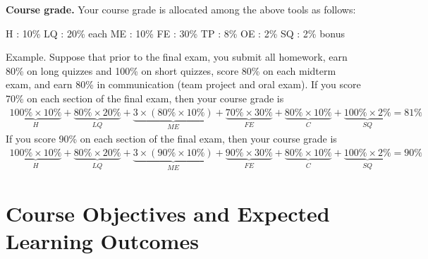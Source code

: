 \noindent{}\textbf{Course grade.}
Your course grade is allocated among the above tools as follows:
\begin{center}
{} \hfill{} H : 10\% \hfill{} LQ : 20\% \hfill{} each ME : 10\% \hfill{} FE : 30\% \hfill{} TP : 8\% \hfill{} OE : 2\% \hfill{} SQ : 2\% bonus \hfill{} {}
\end{center}
Example. Suppose that prior to the final exam, you submit all homework, earn 80\% on long quizzes and 100\% on short quizzes, score 80\% on each midterm exam, and earn 80\% in communication (team project and oral exam). If you score 70\% on each section of the final exam, then your course grade is
\begin{align*}
\underbrace{100\% \times 10 \%}_{H} + \underbrace{80\% \times 20 \%}_{LQ} + \underbrace{3 \times \left(80\% \times 10 \%\right)}_{ME} + \underbrace{70\% \times 30 \%}_{FE} + \underbrace{80\% \times 10 \%}_{C} + \underbrace{100\% \times 2 \%}_{SQ}
=
81 \%
\end{align*}
If you score 90\% on each section of the final exam, then your course grade is
\begin{align*}
\underbrace{100\% \times 10 \%}_{H} + \underbrace{80\% \times 20 \%}_{LQ} + \underbrace{3 \times \left(90\% \times 10 \%\right)}_{ME} + \underbrace{90\% \times 30 \%}_{FE} + \underbrace{80\% \times 10 \%}_{C} + \underbrace{100\% \times 2 \%}_{SQ}
=
90 \%
\end{align*}





%
%
%
%


\section{Course Objectives and Expected Learning Outcomes}

